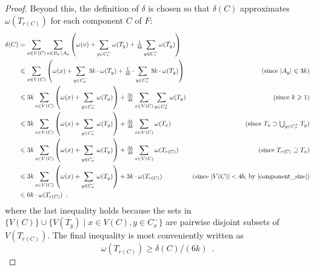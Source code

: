 \documentclass{patmorin}
\renewcommand{\ge}{\geqslant}
\renewcommand{\le}{\leqslant}
\begin{document}
\begin{proof}
  
  Beyond this, the definition of $\delta$ is chosen so that $\delta(C)$ approximates $\omega(T_{r(C)})$ for each component $C$ of $F$:
  \begin{align}
    \delta(C) 
    & = \sum_{x\in V(C)}\sum_{v\in B_x\setminus A_x}\left(\omega(v)+\sum_{y\in C^-_v} \omega(T_y) 
      + \tfrac{1}{4b}\sum_{y\in C^+_v}\omega(T_y)\right) \nonumber \\
    & \le \sum_{x\in V(C)}\left(\omega(x)+\sum_{y\in C^-_x} 3k\cdot\omega(T_y) 
      + \tfrac{1}{4b}\cdot\sum_{y\in C^+_x}3k\cdot\omega(T_y)\right) 
      & \text{(since $|A_y|\le 3k$)} \nonumber\\
    & \le 3k\sum_{x\in V(C)}\left(\omega(x)+\sum_{y\in C^-_x} \omega(T_y)\right) 
      + \tfrac{3k}{4b}\sum_{x\in V(C)}\sum_{y\in C^+_x}\omega(T_y) 
      & \text{(since $k\ge 1$)}\nonumber\\
    & \le 3k\sum_{x\in V(C)}\left(\omega(x)+\sum_{y\in C^-_x} \omega(T_y)\right) 
      + \tfrac{3k}{4b}\sum_{x\in V(C)}\omega(T_{x}) 
      & \text{(since $\textstyle T_x\supset\bigcup_{y\in C^+_x}T_y$)}\nonumber\\
    & \le 3k\sum_{x\in V(C)}\left(\omega(x)+\sum_{y\in C^-_x} \omega(T_y)\right) 
      + \tfrac{3k}{4b}\sum_{x\in V(C)}\omega(T_{r(C)}) 
      & \text{(since $T_{r(C)}\supseteq T_x$)}\nonumber\\
    & \le 3k\sum_{x\in V(C)}\left(\omega(x)
      + \sum_{y\in C^-_x} \omega(T_y)\right) + 3k\cdot \omega(T_{r(C)}) 
      & \text{(since $|V(C)|<4b$, by \ref{component_size})} \nonumber \\
    & \le 6k\cdot\omega(T_{r(C)})
    \enspace . \label{delta_c_upper_bound}
  \end{align}
  where the last inequality holds because the sets in $\{V(C)\} \cup \{ V(T_y)\mid x\in V(C), y\in C^-_x\}$ are pairwise disjoint subsets of $V(T_{r(C)})$. The final inequality is most conveniently written as 
  \begin{equation}  
    \omega(T_{r(C)}) \ge \delta(C) / (6k) \enspace . \label{omega_trC_lower_bound}
  \end{equation}  


\end{proof}
\end{document}
